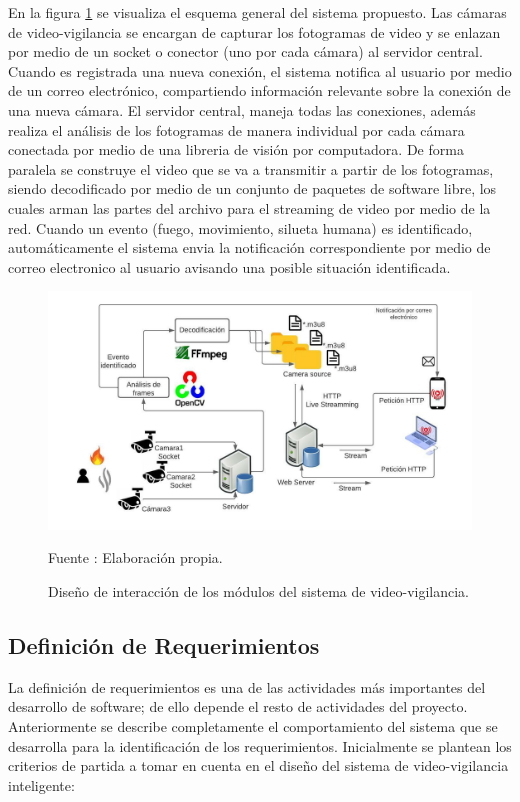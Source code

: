En la figura \ref{fig:system_desing} se visualiza el esquema general del sistema propuesto. Las cámaras de video-vigilancia se encargan de capturar los fotogramas de video y se enlazan por medio de un socket o conector (uno por cada cámara) al servidor central. Cuando es registrada una nueva conexión, el sistema notifica al usuario por medio de un correo electrónico, compartiendo información relevante sobre la conexión de una nueva cámara. El servidor central, maneja todas las conexiones, además realiza el análisis de los fotogramas de manera individual por cada cámara conectada por medio de una libreria de visión por computadora. De forma paralela se construye el video que se va a transmitir a partir de los fotogramas, siendo decodificado por medio de un conjunto de paquetes de software libre, los cuales arman las partes del archivo para el streaming de video por medio de la red. Cuando un evento (fuego, movimiento, silueta humana) es identificado, automáticamente el sistema envia la notificación correspondiente por medio de correo electronico al usuario avisando una posible situación identificada.\\

\begin{figure}[H]
    \begin{center}
        \includegraphics[width=17cm]{img/capitulo_4/main.jpeg}
        \caption{Diseño de interacción de los módulos del sistema de video-vigilancia.}
        Fuente : Elaboración propia.
        \label{fig:system_desing}
    \end{center}
\end{figure}

\subsection{Definición de Requerimientos}
La definición de requerimientos es una de las actividades más importantes del desarrollo de software; de ello depende el resto de actividades del proyecto. Anteriormente se describe completamente el comportamiento del sistema que se desarrolla para la identificación de los requerimientos. Inicialmente se plantean los criterios de partida a tomar en cuenta en el diseño del sistema de video-vigilancia inteligente:

